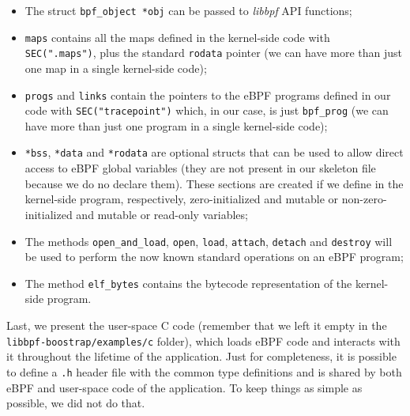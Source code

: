 \begin{itemize}
	\item The struct \verb|bpf_object *obj| can be passed to \textit{libbpf} API 
		functions;
	\item \verb|maps| contains all the maps defined in the kernel-side code	with
		\verb|SEC(".maps")|, plus the standard \verb|rodata| pointer (we can have more than just one map in a single kernel-side code);
	\item \verb|progs| and \verb|links| contain the pointers to the eBPF programs
		defined in our code with \verb|SEC("tracepoint")| which, in our case, is just \verb|bpf_prog| (we can have more than just one program in a single kernel-side code);
	\item \verb|*bss|, \verb|*data| and \verb|*rodata| are optional structs that can
		be used to allow direct access to eBPF global variables (they are not present in our skeleton file because we do no declare them).
		These sections are created if we define in the kernel-side program, respectively, zero-initialized and mutable or non-zero-initialized and mutable or read-only variables;
	\item The methods \verb|open_and_load|, \verb|open|, \verb|load|, \verb|attach|,
		\verb|detach| and \verb|destroy| will be used to perform the now known standard operations on an eBPF program;
	\item The method \verb|elf_bytes| contains the bytecode representation of the
		kernel-side program.
\end{itemize}

Last, we present the user-space C code (remember that we left it empty in the \verb|libbpf-boostrap/examples/c| folder), which loads eBPF code and interacts with it throughout the lifetime of the application.
Just for completeness, it is possible to define a \verb|.h| header file with the common type definitions and is shared by both eBPF and user-space code of the application.
To keep things as simple as possible, we did not do that.


